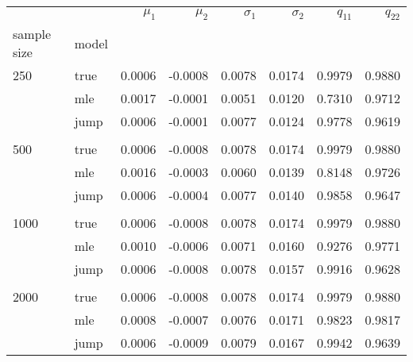 \begin{tabular}{llrrrrrr}
\toprule
     &      &  $\mu_1$ &  $\mu_2$ &  $\sigma_1$ &  $\sigma_2$ &  $q_{11}$ &  $q_{22}$ \\
sample size & model &          &          &             &             &         &         \\
\midrule
250  & true &   0.0006 &  -0.0008 &      0.0078 &      0.0174 &  0.9979 &  0.9880 \\
     & mle &   0.0017 &  -0.0001 &      0.0051 &      0.0120 &  0.7310 &  0.9712 \\
     & jump &   0.0006 &  -0.0001 &      0.0077 &      0.0124 &  0.9778 &  0.9619 \\
     \\
500  & true &   0.0006 &  -0.0008 &      0.0078 &      0.0174 &  0.9979 &  0.9880 \\
     & mle &   0.0016 &  -0.0003 &      0.0060 &      0.0139 &  0.8148 &  0.9726 \\
     & jump &   0.0006 &  -0.0004 &      0.0077 &      0.0140 &  0.9858 &  0.9647 \\
     \\
1000 & true &   0.0006 &  -0.0008 &      0.0078 &      0.0174 &  0.9979 &  0.9880 \\
     & mle &   0.0010 &  -0.0006 &      0.0071 &      0.0160 &  0.9276 &  0.9771 \\
     & jump &   0.0006 &  -0.0008 &      0.0078 &      0.0157 &  0.9916 &  0.9628 \\
     \\
2000 & true &   0.0006 &  -0.0008 &      0.0078 &      0.0174 &  0.9979 &  0.9880 \\
     & mle &   0.0008 &  -0.0007 &      0.0076 &      0.0171 &  0.9823 &  0.9817 \\
     & jump &   0.0006 &  -0.0009 &      0.0079 &      0.0167 &  0.9942 &  0.9639 \\
\bottomrule
\end{tabular}
